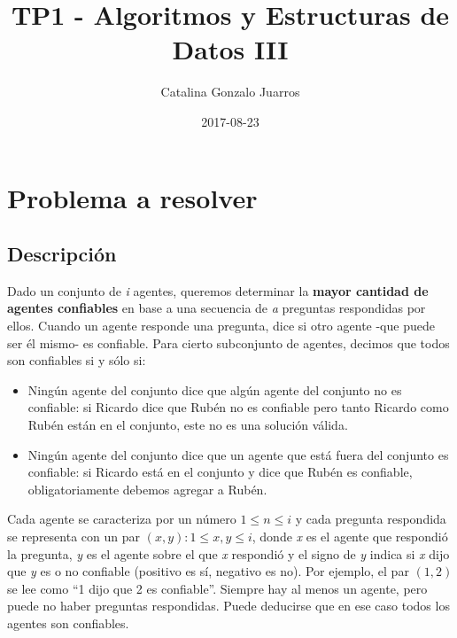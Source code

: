\documentclass[10pt, a4paper]{article}
\title{TP1 - Algoritmos y Estructuras de Datos III}
\date{2017-08-23}
\author{Catalina Gonzalo Juarros}
\begin{document}

\maketitle

\newpage

\tableofcontents

\newpage


\section{Problema a resolver}

	\subsection{Descripci\'on}

		Dado un conjunto de \textit{i} agentes, queremos determinar la \textbf{mayor cantidad de agentes confiables} en base a una secuencia de \textit{a} preguntas respondidas por ellos. Cuando un agente responde una pregunta, dice si otro agente -que puede ser \'el mismo- es confiable. Para cierto subconjunto de agentes, decimos que todos son confiables si y s\'olo si:
	
		\begin{itemize}
		\item Ning\'un agente del conjunto dice que alg\'un agente del conjunto no es confiable: si Ricardo dice que Rub\'en no es confiable pero tanto Ricardo como Rub\'en est\'an en el conjunto, este no es una soluci\'on v\'alida.
		\item Ning\'un agente del conjunto dice que un agente que est\'a fuera del conjunto es confiable: si Ricardo est\'a en el conjunto y dice que Rub\'en es confiable, obligatoriamente debemos agregar a Rub\'en.
		\end{itemize}
		
		Cada agente se caracteriza por un n\'umero $1 \leq n \leq i$ y cada pregunta respondida se representa con un par $(x,y): 1 \leq x,y \leq i$, donde \textit{x} es el agente que respondi\'o la pregunta, \textit{y} es el agente sobre el que \textit{x} respondi\'o y el signo de \textit{y} indica si \textit{x} dijo que \textit{y} es o no confiable (positivo es s\'i, negativo es no). Por ejemplo, el par $(1,2)$ se lee como ``1 dijo que 2 es confiable''. Siempre hay al menos un agente, pero puede no haber preguntas respondidas. Puede deducirse que en ese caso todos los agentes son confiables.
		
\end{document}
